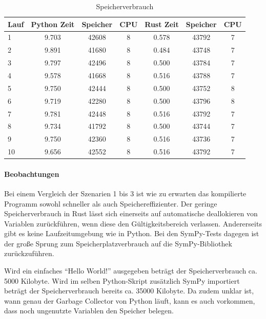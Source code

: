\documentclass[11pt,a4paper, ngerman]{article}
\begin{document}
\begin{table}[h!]
    \caption{Speicherverbrauch}
    \centering
    \begin{tabular}{|l|c|c|c|c|c|c|}
        \hline
        \textbf{Lauf} & \textbf{Python Zeit} & \textbf{Speicher} & \textbf{CPU} & \textbf{Rust Zeit} & \textbf{Speicher} & \textbf{CPU} \\
        \hline
        1 & 9.703 & 42608 & 8 & 0.578 & 43792 & 7 \\
        \hline
        2 & 9.891 & 41680 & 8 & 0.484 & 43748 & 7 \\
        \hline
        3 & 9.797 & 42496 & 8 & 0.500 & 43784 & 7 \\
        \hline
        4 & 9.578 & 41668 & 8 & 0.516 & 43788 & 7 \\
        \hline
        5 & 9.750 & 42444 & 8 & 0.500 & 43752 & 8 \\
        \hline
        6 & 9.719 & 42280 & 8 & 0.500 & 43796 & 8 \\
        \hline
        7 & 9.781 & 42448 & 8 & 0.516 & 43792 & 7 \\
        \hline
        8 & 9.734 & 41792 & 8 & 0.500 & 43744 & 7 \\
        \hline
        9 & 9.750 & 42360 & 8 & 0.516 & 43736 & 7 \\
        \hline
        10 & 9.656 & 42552 & 8 & 0.516 & 43792 & 7 \\
        \hline
    \end{tabular}
\end{table}

\paragraph{Beobachtungen} Bei einem Vergleich der Szenarien 1 bis 3 ist wie zu erwarten das kompilierte Programm sowohl schneller als auch Speichereffizienter. Der geringe Speicherverbrauch in Rust lässt sich einerseits auf automatische deallokieren von Variablen zurückführen, wenn diese den Gültigkeitsbereich verlassen. Andererseits gibt es keine Laufzeitumgebung wie in Python. Bei den SymPy-Tests dagegen ist der große Sprung zum Speicherplatzverbrauch auf die SymPy-Bibliothek zurückzuführen.

Wird ein einfaches ``Hello World!'' ausgegeben beträgt der Speicherverbrauch ca. 5000 Kilobyte. Wird im selben Python-Skript zusätzlich SymPy importiert beträgt der Speicherverbrauch bereits ca. 35000 Kilobyte. Da zudem unklar ist, wann genau der Garbage Collector von Python läuft, kann es auch vorkommen, dass noch ungenutzte Variablen den Speicher belegen.
\end{document}

